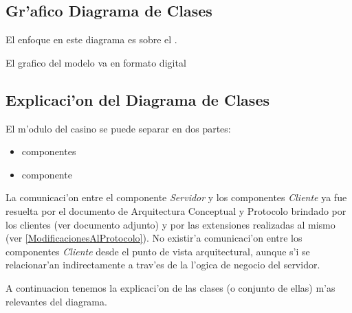 \subsection{Gr'afico Diagrama de Clases}

El enfoque en este diagrama es sobre el .

El grafico del modelo va en formato digital

% 

% 

\clearpage

\subsection{Explicaci'on del Diagrama de Clases}

El m'odulo del casino se puede separar en dos partes: 

\begin{itemize}
\item componentes 
\item componente 
\end{itemize}  

La comunicaci'on entre el componente {\it Servidor} y los componentes {\it Cliente} ya fue resuelta por el documento de Arquitectura Conceptual y Protocolo brindado por los clientes (ver documento adjunto) y por las extensiones realizadas al mismo (ver \ref{ModificacionesAlProtocolo}).
No existir'a comunicaci'on entre los componentes {\it Cliente} desde el punto de vista arquitectural, aunque s'i se relacionar'an indirectamente a trav'es de la l'ogica de negocio del servidor.

A continuacion tenemos la explicaci'on de las clases (o conjunto de ellas) m'as relevantes del diagrama.

